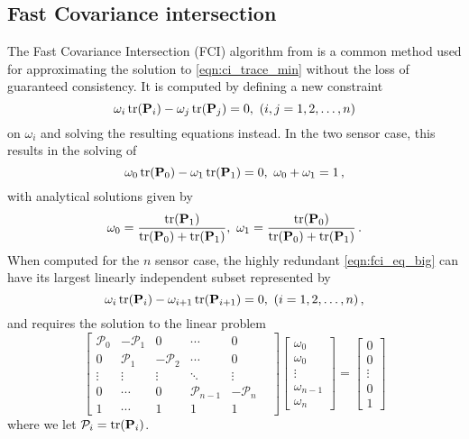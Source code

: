 \documentclass[letterpaper, 10 pt, conference]{ieeeconf}  %
\begin{document}
\subsection{Fast Covariance intersection}
The Fast Covariance Intersection (FCI) algorithm from \cite{niehsenInformationFusionBased2002} is a common method used for approximating the solution to \eqref{eqn:ci_trace_min} without the loss of guaranteed consistency. It is computed by defining a new constraint
\begin{equation}
   \omega_i \operatorname{tr}({{\mathbf{P}}}_i) - \omega_j \operatorname{tr}({{\mathbf{P}}}_j) = 0,\ (i,j=1,2,\dots,n) \label{eqn:fci_eq_big}
\end{equation}
on $\omega_i$ and solving the resulting equations instead. In the two sensor case, this results in the solving of
\begin{equation}
   \omega_0 \operatorname{tr}({{\mathbf{P}}}_0) - \omega_1 \operatorname{tr}({{\mathbf{P}}}_1) = 0,\ \omega_0 + \omega_1 = 1\,, \label{eqn:fci_2sen_omega_sum_eq}
\end{equation}
with analytical solutions given by
\begin{equation}
   \omega_0 = \frac{\operatorname{tr}({{\mathbf{P}}}_1)}{\operatorname{tr}({{\mathbf{P}}}_0)+\operatorname{tr}({{\mathbf{P}}}_1)},\ \omega_1 = \frac{\operatorname{tr}({{\mathbf{P}}}_0)}{\operatorname{tr}({{\mathbf{P}}}_0)+\operatorname{tr}({{\mathbf{P}}}_1)}\,. \label{eqn:fci_2sen_sol}
\end{equation}
When computed for the $n$ sensor case, the highly redundant \eqref{eqn:fci_eq_big} can have its largest linearly independent subset represented by
\begin{equation}
   \omega_i \operatorname{tr}({{\mathbf{P}}}_i) - \omega_{i+1} \operatorname{tr}({{\mathbf{P}}}_{i+1}) = 0,\ (i=1,2,\dots,n)\,, \label{eqn:fci_eq}
\end{equation}
and requires the solution to the linear problem
\begin{equation}
   \begin{bmatrix}
      \mathcal{P}_0 & -\mathcal{P}_1 & 0 & \cdots & 0 \\
      0 & \mathcal{P}_1 & -\mathcal{P}_2 & \cdots & 0 \\
      \vdots & \vdots & \vdots & \ddots & \vdots & \\
      0 & \cdots & 0 & \mathcal{P}_{n-1} & -\mathcal{P}_n \\
      1 & \cdots & 1 & 1 & 1 &
   \end{bmatrix}
   \begin{bmatrix}
      \omega_0 \\
      \omega_0 \\
      \vdots \\
      \omega_{n-1} \\
      \omega_n
   \end{bmatrix}
   =
   \begin{bmatrix}
      0 \\
      0 \\
      \vdots \\
      0 \\
      1
   \end{bmatrix} \label{eqn:fci_eq_sys}
\end{equation}
where we let $\mathcal{P}_i = \operatorname{tr}({{\mathbf{P}}}_i)$.
\end{document}
